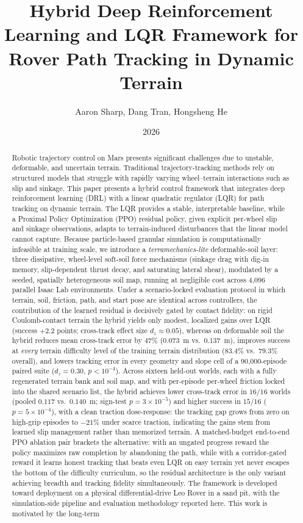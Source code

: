 \documentclass[conference]{IEEEtran}
\title{Hybrid Deep Reinforcement Learning and LQR Framework for Rover Path Tracking in Dynamic Terrain}
\author{Aaron Sharp, Dang Tran, Hongsheng He}
\date{2026}
\begin{document}
\maketitle

\begin{abstract}
Robotic trajectory control on Mars presents significant challenges due to unstable, deformable, and uncertain terrain. Traditional trajectory-tracking methods rely on structured models that struggle with rapidly varying wheel--terrain interactions such as slip and sinkage. This paper presents a hybrid control framework that integrates deep reinforcement learning (DRL) with a linear quadratic regulator (LQR) for path tracking on dynamic terrain. The LQR provides a stable, interpretable baseline, while a Proximal Policy Optimization (PPO) residual policy, given explicit per-wheel slip and sinkage observations, adapts to terrain-induced disturbances that the linear model cannot capture. Because particle-based granular simulation is computationally infeasible at training scale, we introduce a \emph{terramechanics-lite} deformable-soil layer: three dissipative, wheel-level soft-soil force mechanisms (sinkage drag with dig-in memory, slip-dependent thrust decay, and saturating lateral shear), modulated by a seeded, spatially heterogeneous soil map, running at negligible cost across 4{,}096 parallel Isaac Lab environments. Under a scenario-locked evaluation protocol in which terrain, soil, friction, path, and start pose are identical across controllers, the contribution of the learned residual is decisively gated by contact fidelity: on rigid Coulomb-contact terrain the hybrid yields only modest, localized gains over LQR (success $+2.2$ points; cross-track effect size $d_z\!\approx\!0.05$), whereas on deformable soil the hybrid reduces mean cross-track error by $47\%$ (0.073~m vs.\ 0.137~m), improves success at \emph{every} terrain difficulty level of the training terrain distribution ($83.4\%$ vs.\ $79.3\%$ overall), and lowers tracking error in every geometry and slope cell of a 90{,}000-episode paired suite ($d_z=0.30$, $p<10^{-4}$). Across sixteen held-out worlds, each with a fully regenerated terrain bank and soil map, and with per-episode per-wheel friction locked into the shared scenario list, the hybrid achieves lower cross-track error in $16/16$ worlds (pooled $0.117$ vs.\ $0.140$~m; sign-test $p = 3\times10^{-5}$) and higher success in $15/16$ ($p = 5\times10^{-4}$), with a clean traction dose-response: the tracking gap grows from zero on high-grip episodes to $-21\%$ under scarce traction, indicating the gains stem from learned slip management rather than memorized terrain. A matched-budget end-to-end PPO ablation pair brackets the alternative: with an ungated progress reward the policy maximizes raw completion by abandoning the path, while with a corridor-gated reward it learns honest tracking that beats even LQR on easy terrain yet never escapes the bottom of the difficulty curriculum, so the residual architecture is the only variant achieving breadth and tracking fidelity simultaneously. The framework is developed toward deployment on a physical differential-drive Leo Rover in a sand pit, with the simulation-side pipeline and evaluation methodology reported here. This work is motivated by the long-term 
\end{abstract}
\end{document}
